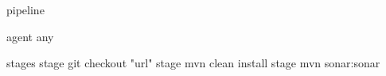 pipeline{
	agent any
	
	
	stages{
		stage{
			git checkout "url"
			}
		stage{
			mvn clean install
			}
		stage{
			mvn sonar:sonar
			}
			}
			}